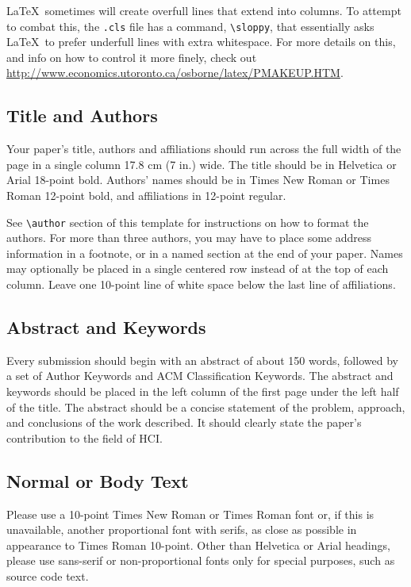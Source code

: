 \documentclass{sigchi}
\begin{document}
\LaTeX\ sometimes will create overfull lines that extend into columns.
To attempt to combat this, the \texttt{.cls} file has a command,
\texttt{{\textbackslash}sloppy}, that essentially asks \LaTeX\ to
prefer underfull lines with extra whitespace.  For more details on
this, and info on how to control it more finely, check out
{\url{http://www.economics.utoronto.ca/osborne/latex/PMAKEUP.HTM}}.


\subsection{Title and Authors}

Your paper's title, authors and affiliations should run across the
full width of the page in a single column 17.8 cm (7 in.) wide.  The
title should be in Helvetica or Arial 18-point bold.  Authors' names
should be in Times New Roman or Times Roman 12-point bold, and
affiliations in 12-point regular.  

See \texttt{{\textbackslash}author} section of this template for
instructions on how to format the authors. For more than three
authors, you may have to place some address information in a footnote,
or in a named section at the end of your paper. Names may optionally
be placed in a single centered row instead of at the top of each
column. Leave one 10-point line of white space below the last line of
affiliations.

\subsection{Abstract and Keywords}

Every submission should begin with an abstract of about 150 words,
followed by a set of Author Keywords and ACM Classification
Keywords. The abstract and keywords should be placed in the left
column of the first page under the left half of the title. The
abstract should be a concise statement of the problem, approach, and
conclusions of the work described. It should clearly state the paper's
contribution to the field of HCI\@.

\subsection{Normal or Body Text}

Please use a 10-point Times New Roman or Times Roman font or, if this
is unavailable, another proportional font with serifs, as close as
possible in appearance to Times Roman 10-point. Other than Helvetica
or Arial headings, please use sans-serif or non-proportional fonts
only for special purposes, such as source code text.
\end{document}
